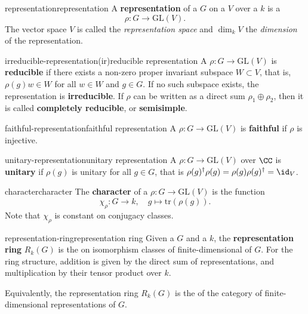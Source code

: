 \begin{topic}{representation}{representation}
    A \textbf{representation} of a  $G$ on a  $V$ over a  $k$ is a 
    \[ \rho : G \to \text{GL}(V) . \]
    The vector space $V$ is called the \textit{representation space} and $\dim_k V$ the \textit{dimension} of the representation.
\end{topic}

\begin{topic}{irreducible-representation}{(ir)reducible representation}
    A  $\rho : G \to \text{GL}(V)$ is \textbf{reducible} if there exists a non-zero proper invariant subspace $W \subset V$, that is, $\rho(g) w \in W$ for all $w \in W$ and $g \in G$. If no such subspace exists, the representation is \textbf{irreducible}. If $\rho$ can be written as a direct sum $\rho_1 \oplus \rho_2$, then it is called \textbf{completely reducible}, or \textbf{semisimple}.
\end{topic}

\begin{topic}{faithful-representation}{faithful representation}
    A  $\rho : G \to \text{GL}(V)$ is \textbf{faithful} if $\rho$ is injective.
\end{topic}

\begin{topic}{unitary-representation}{unitary representation}
    A  $\rho : G \to \text{GL}(V)$ over $\CC$ is \textbf{unitary} if $\rho(g)$ is unitary for all $g \in G$, that is $\rho(g)^\dagger \rho(g) = \rho(g) \rho(g)^\dagger = \id_V$.
\end{topic}

\begin{topic}{character}{character}
    The \textbf{character} of a  $\rho : G \to \text{GL}(V)$ is the function
    \[ \chi_\rho : G \to k, \quad g \mapsto \text{tr}(\rho(g)) . \]
    Note that $\chi_\rho$ is constant on conjugacy classes.
\end{topic}

\begin{topic}{representation-ring}{representation ring}
    Given a  $G$ and a  $k$, the \textbf{representation ring} $R_k(G)$ is the  on isomorphism classes of finite-dimensional  of $G$. For the ring structure, addition is given by the direct sum of representations, and multiplication by their tensor product over $k$.
    
    Equivalently, the representation ring $R_k(G)$ is the  of the category of finite-dimensional representations of $G$.
\end{topic}

